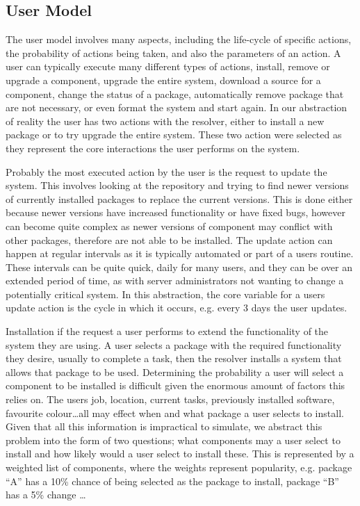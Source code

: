 \subsection{User Model}
The user model involves many aspects, including the life-cycle of specific actions, the probability of actions being taken, and also the parameters of an action.
A user can typically execute many different types of actions, install, remove or upgrade a component, upgrade the entire system,
download a source for a component, change the status of a package, automatically remove package that are not necessary, or even format the system and start again.
In our abstraction of reality the user has two actions with the resolver, either to install a new package or to try upgrade the entire system.
These two action were selected as they represent the core interactions the user performs on the system.

Probably the most executed action by the user is the request to update the system.
This involves looking at the repository and trying to find newer versions of currently installed packages to replace the current versions.
This is done either because newer versions have increased functionality or have fixed bugs,
however can become quite complex as newer versions of component may conflict with other packages, therefore are not able to be installed.
The update action can happen at regular intervals as it is typically automated or part of a users routine.
These intervals can be quite quick, daily for many users, 
and they can be over an extended period of time, 
as with server administrators not wanting to change a potentially critical system.
In this abstraction, the core variable for a users update action is the cycle in which it occurs,
e.g. every 3 days the user updates.

Installation if the request a user performs to extend the functionality of the system they are using.
A user selects a package with the required functionality they desire, usually to complete a task,
then the resolver installs a system that allows that package to be used.
Determining the probability a user will select a component to be installed is difficult given the enormous amount of factors this relies on.
The users job, location, current tasks, previously installed software, favourite colour\ldots all may effect when and what package a user selects to install.
Given that all this information is impractical to simulate, we abstract this problem into the form of two questions;
what components may a user select to install and how likely would a user select to install these.
This is represented by a weighted list of components, where the weights represent popularity,
e.g. package ``A'' has a 10\% chance of being selected as the package to install, package ``B'' has a 5\% change \ldots


